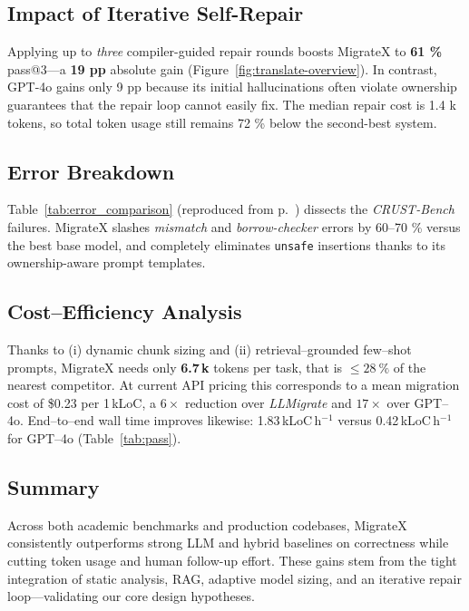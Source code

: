 \documentclass[twocolumn]{article}
\begin{document}
    \subsection{Impact of Iterative Self-Repair}
    \label{subsec:repair}
    Applying up to \emph{three} compiler-guided repair rounds boosts MigrateX to \textbf{61 \%} pass@3—a
    \textbf{19 pp} absolute gain (Figure~\ref{fig:translate-overview}).  
    In contrast, GPT-4o gains only 9 pp because its initial hallucinations often violate ownership guarantees that the repair loop cannot easily fix.  
    The median repair cost is 1.4 k tokens, so total token usage still remains 72 \% below the second-best system.
    
    
    \subsection{Error Breakdown}
    \label{subsec:error}
    Table~\ref{tab:error_comparison} (reproduced from p.~\pageref{tab:error_comparison}) dissects the \emph{CRUST-Bench} failures.  
    MigrateX slashes \emph{mismatch} and \emph{borrow-checker} errors by 60–70 \% versus the best base model, and completely eliminates \texttt{unsafe} insertions thanks to its ownership-aware prompt templates.  
    
    \subsection{Cost--Efficiency Analysis}
\label{subsec:cost}
Thanks to (i) dynamic chunk sizing and (ii) retrieval--grounded few--shot
prompts, MigrateX needs only \textbf{6.7\,k} tokens per task,
that is \textit{\(\leq 28\ \%\)} of the nearest competitor.  
At current API pricing this corresponds to a mean migration cost of
\$0.23 per 1\,kLoC, a \textit{\(6\times\)} reduction over
\emph{LLMigrate} and \textit{\(17\times\)} over GPT--4o.  
End--to--end wall time improves likewise: 1.83\,kLoC\,h\(^{-1}\) versus
0.42\,kLoC\,h\(^{-1}\) for GPT--4o (Table~\ref{tab:pass}).

    
    \subsection{Summary}
    Across both academic benchmarks and production codebases, MigrateX consistently outperforms strong LLM and hybrid baselines on correctness while cutting token usage and human follow-up effort.  
    These gains stem from the tight integration of static analysis, RAG, adaptive model sizing, and an iterative repair loop—validating our core design hypotheses.
    
\end{document}
